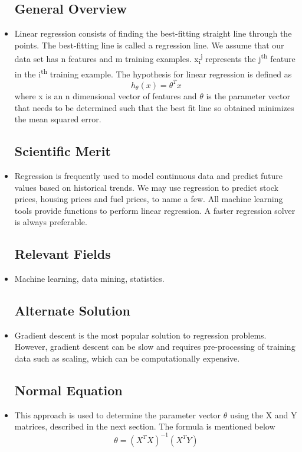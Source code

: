 \documentclass{article}
\begin{document}
\begin{spacing}{1.1}
\begin{itemize}
    \subsection{General Overview}
    \item Linear regression consists of finding the best-fitting straight line through the points. The best-fitting line is called a regression line. We assume that our data set has n features and m training examples. x\textsubscript{i}\textsuperscript{j} represents the j\textsuperscript{th} feature in the i\textsuperscript{th} training example. The hypothesis for linear regression is defined as $$h_\theta(x)=\theta^Tx$$ where x is an n dimensional vector of features and $\theta$ is the parameter vector that needs to be determined such that the best fit line so obtained minimizes the mean squared error. 
    \subsection{Scientific Merit}
    \item Regression is frequently used to model continuous data and predict future values based on historical trends. We may use regression to predict stock prices, housing prices and fuel prices, to name a few. All machine learning tools provide functions to perform linear regression. A faster regression solver is always preferable. 
    \subsection{Relevant Fields}
    \item Machine learning, data mining, statistics.
    \subsection{Alternate Solution}
    \item Gradient descent \cite{GDRef} is the most popular solution to regression problems. However, gradient descent can be slow and requires pre-processing of training data such as scaling, which can be computationally expensive. 
    \subsection{Normal Equation}
    \item This approach is used to determine the parameter vector $\theta$ using the X and Y matrices, described in the next section. The formula is mentioned below
    $$\theta=(X^TX)^{-1}(X^TY)$$
\end{itemize}



\end{spacing}
\end{document}
